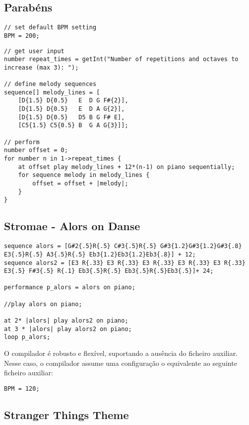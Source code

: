 \documentclass{article}
\begin{document}
\subsection{Parabéns}
\begin{lstlisting}[caption=bday.aux]
// set default BPM setting
BPM = 200;
\end{lstlisting}

\begin{lstlisting}[caption=bday.mux]
// get user input
number repeat_times = getInt("Number of repetitions and octaves to increase (max 3): ");

// define melody sequences
sequence[] melody_lines = [
    [D{1.5} D{0.5}   E  D G F#{2}], 
    [D{1.5} D{0.5}   E  D A G{2}],
    [D{1.5} D{0.5}   D5 B G F# E],
    [C5{1.5} C5{0.5} B  G A G{3}]];

// perform
number offset = 0;
for number n in 1->repeat_times {
	at offset play melody_lines + 12*(n-1) on piano sequentially;
	for sequence melody in melody_lines {
		offset = offset + |melody|;
	}
}
\end{lstlisting}

\clearpage
\subsection{Stromae - Alors on Danse}
\begin{lstlisting}[caption=rap.mux]
sequence alors = [G#2{.5}R{.5} C#3{.5}R{.5} G#3{1.2}G#3{1.2}G#3{.8} E3{.5}R{.5} A3{.5}R{.5} Eb3{1.2}Eb3{1.2}Eb3{.8}] + 12;
sequence alors2 = [E3 R{.33} E3 R{.33} E3 R{.33} E3 R{.33} E3 R{.33} E3{.5} F#3{.5} R{.1} Eb3{.5}R{.5} Eb3{.5}R{.5}Eb3{.5}]+ 24;

performance p_alors = alors on piano;

//play alors on piano;

at 2* |alors| play alors2 on piano;
at 3 * |alors| play alors2 on piano;
loop p_alors;

\end{lstlisting}


O compilador é robusto e flexível, suportando a ausência do ficheiro auxiliar. Nesse caso, o compilador assume uma configuração o equivalente ao seguinte ficheiro auxiliar:
\begin{lstlisting}[caption=default.aux]
BPM = 120;
\end{lstlisting}

\clearpage
\subsection{Stranger Things Theme}
\end{document}
